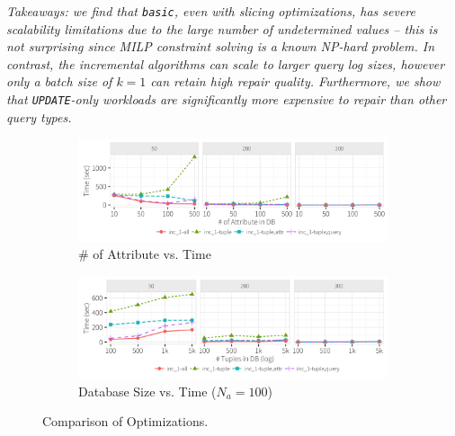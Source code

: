 {\it Takeaways: we find that \texttt{basic}, even with slicing optimizations,
has severe scalability limitations due to the large number of undetermined values -- this is not surprising
since MILP constraint solving is a known NP-hard problem.
In contrast, the incremental algorithms can scale to larger query log sizes, however only a batch size of $k=1$ can retain high repair quality.
Furthermore, we show that \texttt{UPDATE}-only workloads are significantly more expensive to repair than other query types. 
}

 \begin{figure}[h]
    \vspace*{-.1in}
    \centering
    \begin{subfigure}[t]{.45\textwidth}
    \includegraphics[width = .99\columnwidth]{figures/attr_time}
    \vspace*{-.1in}
    \caption{\# of Attribute vs. Time}
    \label{f:attr} 
    \end{subfigure}
    \begin{subfigure}[t]{.45\textwidth}
    \includegraphics[width = .99\columnwidth]{figures/attr100_time}
    \vspace*{-.1in}
    \caption{Database Size vs. Time ($N_a = 100$)}
    \label{f:attr100} 
    \end{subfigure}
    \vspace*{-.1in}
    \caption{Comparison of Optimizations.}
  \end{figure}
  

